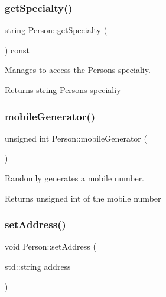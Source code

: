 \subsubsection{\texorpdfstring{get\+Specialty()}{getSpecialty()}}
{\footnotesize\ttfamily string Person\+::get\+Specialty (\begin{DoxyParamCaption}{ }\end{DoxyParamCaption}) const}



Manages to access the \hyperlink{class_person}{Person}\textquotesingle{}s specialiy. 

\begin{DoxyReturn}{Returns}
string \hyperlink{class_person}{Person}\textquotesingle{}s specialiy 
\end{DoxyReturn}
\mbox{\label{class_person_a84de3c2e51ab181bc231a0918faf8fa6}} 
\subsubsection{\texorpdfstring{mobile\+Generator()}{mobileGenerator()}}
{\footnotesize\ttfamily unsigned int Person\+::mobile\+Generator (\begin{DoxyParamCaption}{ }\end{DoxyParamCaption})}



Randomly generates a mobile number. 

\begin{DoxyReturn}{Returns}
unsigned int of the mobile number 
\end{DoxyReturn}
\mbox{\label{class_person_a647fc66d29687250cdba9259e7efe632}} 
\subsubsection{\texorpdfstring{set\+Address()}{setAddress()}}
{\footnotesize\ttfamily void Person\+::set\+Address (\begin{DoxyParamCaption}\item[{std\+::string}]{address }\end{DoxyParamCaption})}



